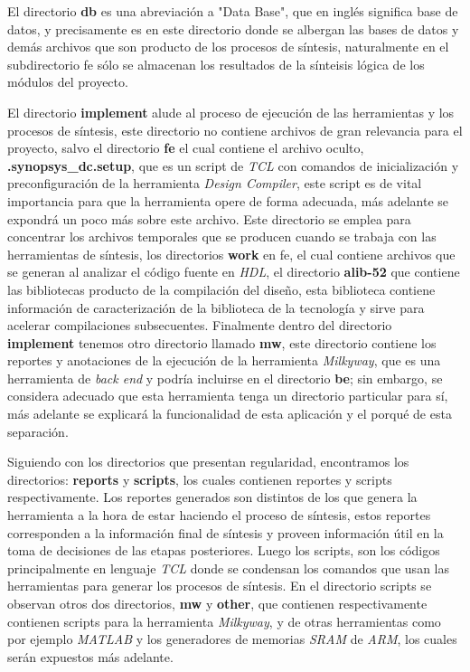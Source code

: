El directorio \textbf{db} es una abreviación a "Data Base", que en inglés significa base de datos, y precisamente es en este directorio donde se albergan las bases de datos y demás archivos que son producto de los procesos de síntesis, naturalmente en el subdirectorio fe sólo se almacenan los resultados de la sínteisis lógica de los módulos del proyecto.

El directorio \textbf{implement} alude al proceso de ejecución de las herramientas y los procesos de síntesis, este directorio no contiene archivos de gran relevancia para el proyecto, salvo el directorio \textbf{fe} el cual contiene el archivo oculto, \textbf{.synopsys\_dc.setup}, que es un script de \textit{TCL} con comandos de inicialización y preconfiguración de la herramienta \textit{Design Compiler}, este script es de vital importancia para que la herramienta opere de forma adecuada, más adelante se expondrá un poco más sobre este archivo. Este directorio se emplea para concentrar los archivos temporales que se producen cuando se trabaja con las herramientas de síntesis, los directorios \textbf{work} en fe, el cual contiene archivos que se generan al analizar el código fuente en \textit{HDL}, el directorio \textbf{alib-52} que contiene las bibliotecas producto de la compilación del diseño, esta biblioteca contiene información de caracterización de la biblioteca de la tecnología y sirve para acelerar compilaciones subsecuentes. Finalmente dentro del directorio \textbf{implement} tenemos otro directorio llamado \textbf{mw}, este directorio contiene los reportes y anotaciones de la ejecución de la herramienta \textit{Milkyway}, que es una herramienta de \textit{back end} y podría incluirse en el directorio \textbf{be}; sin embargo, se considera adecuado que esta herramienta tenga un directorio particular para sí, más adelante se explicará la funcionalidad de esta aplicación y el porqué de esta separación.

Siguiendo con los directorios que presentan regularidad, encontramos los directorios: \textbf{reports} y \textbf{scripts}, los cuales contienen reportes y scripts respectivamente. Los reportes generados son distintos de los que genera la herramienta a la hora de estar haciendo el proceso de síntesis, estos reportes corresponden a la información final de síntesis y proveen información útil en la toma de decisiones de las etapas posteriores. Luego los scripts, son los códigos principalmente en lenguaje \textit{TCL} donde se condensan los comandos que usan las herramientas para generar los procesos de síntesis. En el directorio scripts se observan otros dos directorios, \textbf{mw} y \textbf{other}, que contienen respectivamente contienen scripts para la herramienta \textit{Milkyway}, y de otras herramientas como por ejemplo \textit{MATLAB} y los generadores de memorias \textit{SRAM} de \textit{ARM}, los cuales serán expuestos más adelante.

